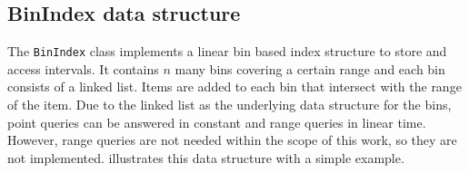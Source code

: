 	\subsection{BinIndex data structure}
	\label{subsec:binindex}
		
		The \texttt{BinIndex} class implements a linear bin based index structure to store and access intervals.
		It contains $n$ many bins covering a certain range and each bin consists of a linked list.
		Items are added to each bin that intersect with the range of the item.
		Due to the linked list as the underlying data structure for the bins, point queries can be answered in constant and range queries in linear time.
		However, range queries are not needed within the scope of this work, so they are not implemented.
		 illustrates this data structure with a simple example.
		

